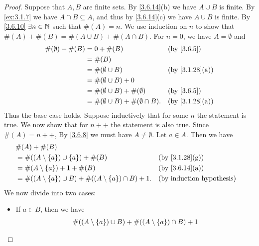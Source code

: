 \begin{proof}
	Suppose that \(A, B\) are finite sets.
	By \cref{3.6.14}(b) we have \(A \cup B\) is finite.
	By \cref{ex:3.1.7} we have \(A \cap B \subseteq A\), and thus by \cref{3.6.14}(c) we have \(A \cup B\) is finite.
	By \cref{3.6.10} \(\exists n \in \mathbb{N}\) such that \(\#(A) = n\).
	We use induction on \(n\) to show that \(\#(A) + \#(B) = \#(A \cup B) + \#(A \cap B)\).
	For \(n = 0\), we have \(A = \emptyset\) and
	\begin{align*}
		\#(\emptyset) + \#(B) & = 0 + \#(B)                                    &  & \by{3.6.5}                   \\
		                      & = \#(B)                                                                          \\
		                      & = \#(\emptyset \cup B)                         &  & \text{(by \cref{3.1.28}(a))} \\
		                      & = \#(\emptyset \cup B) + 0                                                       \\
		                      & = \#(\emptyset \cup B) + \#(\emptyset)         &  & \by{3.6.5}                   \\
		                      & = \#(\emptyset \cup B) + \#(\emptyset \cap B). &  & \text{(by \cref{3.1.28}(a))}
	\end{align*}
	Thus the base case holds.
	Suppose inductively that for some \(n\) the statement is true.
	We now show that for \(n++\) the statement is also true.
	Since \(\#(A) = n++\), By \cref{3.6.8} we must have \(A \neq \emptyset\).
	Let \(a \in A\).
	Then we have
	\begin{align*}
		 & \#(A) + \#(B)                                                                                                \\
		 & = \#((A \setminus \set{a}) \cup \set{a}) + \#(B)                           &  & \text{(by \cref{3.1.28}(g))} \\
		 & = \#(A \setminus \set{a}) + 1 + \#(B)                                      &  & \text{(by \cref{3.6.14}(a))} \\
		 & = \#((A \setminus \set{a}) \cup B) + \#((A \setminus \set{a}) \cap B) + 1. &  & \byIH
	\end{align*}
	We now divide into two cases:
	\begin{itemize}
		\item If \(a \in B\), then we have
		      \begin{align*}
			       & \#((A \setminus \set{a}) \cup B) + \#((A \setminus \set{a}) \cap B) + 1                                           \\

\end{align*}
\end{itemize}
\end{proof}
